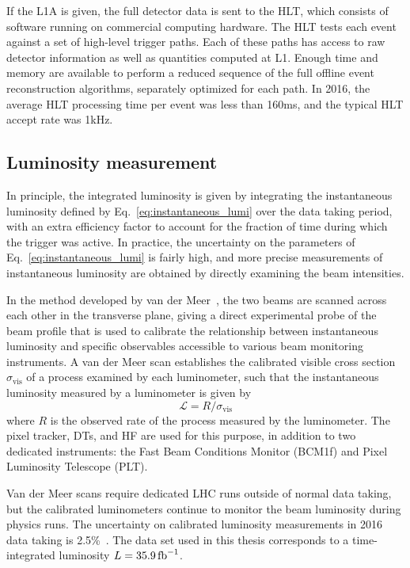 If the L1A is given, the full detector data is sent to the HLT, which consists of software running on commercial computing hardware.
The HLT tests each event against a set of high-level trigger paths. Each of these paths has access to raw detector information as well
as quantities computed at L1. Enough time and memory are available to perform a reduced sequence of the full offline event reconstruction
algorithms, separately optimized for each path. In 2016, the average HLT processing time per event was less than 160\unit{ms},
and the typical HLT accept rate was 1\unit{kHz}.

\subsection{Luminosity measurement} \label{sec:LHCCMS_CMS_lumi}
In principle, the integrated luminosity is given by integrating the instantaneous luminosity defined by Eq.~\ref{eq:instantaneous_lumi} over the data taking period,
with an extra efficiency factor to account for the fraction of time during which the trigger was active. In practice, the uncertainty on the
parameters of Eq.~\ref{eq:instantaneous_lumi} is fairly high, and more precise measurements of instantaneous luminosity are obtained by directly examining the beam intensities.

In the method developed
by van der Meer~\cite{ref:CERN-ISR-PO-68-31}, the two beams are scanned across each other in the transverse plane, giving a direct experimental
probe of the beam profile that is used to calibrate the relationship between instantaneous luminosity and specific observables accessible to various
beam monitoring instruments. A van der Meer scan establishes the calibrated visible cross section $\sigma_\mathrm{vis}$ of a process examined
by each luminometer, such that the instantaneous luminosity measured by a luminometer is given by
\begin{equation}
\mathcal{L} = R / \sigma_\mathrm{vis}
\label{eq:lumi_calibration}
\end{equation}
where $R$ is the observed rate of the process measured by the luminometer. The pixel tracker, DTs, and HF are used for this purpose, in addition to two
dedicated instruments: the Fast Beam Conditions Monitor (BCM1f) and Pixel Luminosity Telescope (PLT).

Van der Meer scans require dedicated LHC runs outside of normal data taking, but the calibrated luminometers continue to monitor the beam luminosity
during physics runs. The uncertainty on calibrated luminosity measurements in 2016 data taking is 2.5\%~\cite{ref:CMS-PAS-LUM-17-001}.
The data set used in this thesis corresponds to a time-integrated luminosity $L = 35.9\fbinv$.
